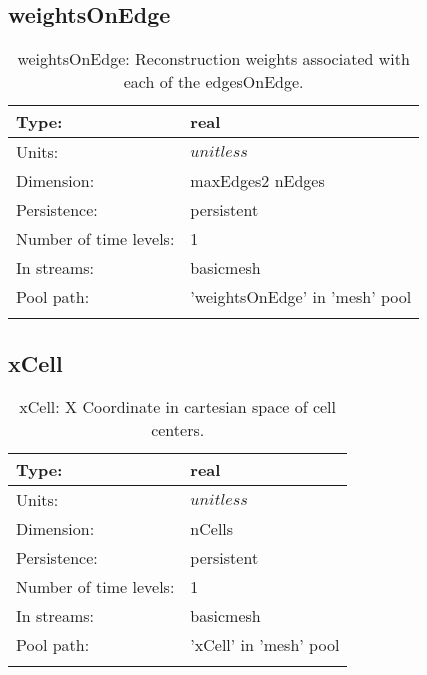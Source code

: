 \subsection[weightsOnEdge]{weightsOnEdge}
\label{subsec:var_sec_mesh_weightsOnEdge}
\begin{center}
\begin{longtable}{| p{2.0in} | p{4.0in} |}
        \hline 
        Type: & real \\
        \hline 
        Units: & $unitless$ \\
        \hline 
        Dimension: & maxEdges2 nEdges \\
        \hline 
        Persistence: & persistent \\
        \hline 
        Number of time levels: & 1 \\
        \hline 
		 In streams: &  basicmesh \\
        \hline 
            Pool path: & 'weightsOnEdge' in 'mesh' pool
 \\
		 \hline 
    \caption{weightsOnEdge: Reconstruction weights associated with each of the edgesOnEdge.}
\end{longtable}
\end{center}
\subsection[xCell]{xCell}
\label{subsec:var_sec_mesh_xCell}
\begin{center}
\begin{longtable}{| p{2.0in} | p{4.0in} |}
        \hline 
        Type: & real \\
        \hline 
        Units: & $unitless$ \\
        \hline 
        Dimension: & nCells \\
        \hline 
        Persistence: & persistent \\
        \hline 
        Number of time levels: & 1 \\
        \hline 
		 In streams: &  basicmesh \\
        \hline 
            Pool path: & 'xCell' in 'mesh' pool
 \\
		 \hline 
    \caption{xCell: X Coordinate in cartesian space of cell centers.}
\end{longtable}
\end{center}
